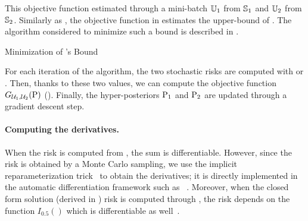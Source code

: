 This objective function estimated through a mini-batch $\batch_1$ from $\S_1$ and $\batch_2$ from $\S_2$. 
Similarly as , the objective function in  estimates the upper-bound of .
The algorithm considered to minimize such a bound is described in .

\begin{algorithm}[H]
 \caption{Minimization of 's Bound}
 \begin{algorithmic}
 \EndFor
 \EndFor
 \end{algorithmic}
 \label{chap:mv-sto:algo:data}
\end{algorithm}

For each iteration of the algorithm, the two stochastic risks are computed with  or .
Then, thanks to these two values, we can compute the objective function $\MulStoObjbatch$ ().
Finally, the hyper-posteriors $\hyperQ_1$ and $\hyperQ_2$ are updated through a gradient descent step.

\paragraph{Computing the derivatives.}
When the risk is computed from , the sum is differentiable.
However, since the risk is obtained by a Monte Carlo sampling, we use the implicit reparameterization trick~\citep{FigurnovMohamedMnih2018, JankowiakObermeyer2018} to obtain the derivatives; it is directly implemented in the automatic differentiation framework such as \pytorch~\citep{Paszke2019}.
Moreover, when the closed form solution (derived in ) risk is computed through , the risk depends on the function $I_{0.5}()$ which is differentiable as well~\citep[see][]{BoikRobinsonCox1999}.\\

